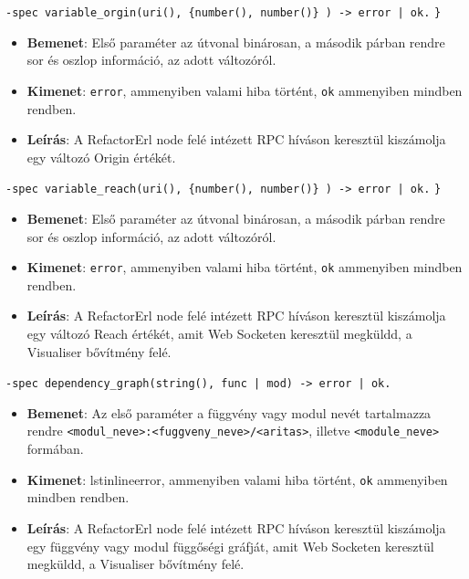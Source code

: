     
    
    \noindent \lstinline|-spec variable_orgin(uri(), {number(), number()} ) -> error |\lstinline{| ok.} \lstinline|}|
    \begin{itemize}
            \item \textbf{Bemenet}: Első paraméter az útvonal binárosan, a második párban rendre sor és oszlop információ, az adott változóról.
            \item \textbf{Kimenet}: \lstinline{error}, ammenyiben valami hiba történt, \lstinline{ok} ammenyiben mindben rendben.
            \item \textbf{Leírás}: A RefactorErl node felé intézett RPC híváson keresztül kiszámolja egy változó Origin értékét.
        \end{itemize}
    
    
    
    \noindent \lstinline|-spec variable_reach(uri(), {number(), number()} ) -> error |\lstinline{| ok.} \lstinline|}|
    \begin{itemize}
            \item \textbf{Bemenet}: Első paraméter az útvonal binárosan, a második párban rendre sor és oszlop információ, az adott változóról.
            \item \textbf{Kimenet}: \lstinline{error}, ammenyiben valami hiba történt, \lstinline{ok} ammenyiben mindben rendben.
            \item \textbf{Leírás}: A RefactorErl node felé intézett RPC híváson keresztül kiszámolja egy változó Reach értékét, amit Web Socketen keresztül megküldd, a Visualiser bővítmény felé. 
        \end{itemize}
    
    
    
    \noindent \lstinline{-spec dependency_graph(string(), func | mod) -> error | ok.}
    \begin{itemize}
            \item \textbf{Bemenet}: Az első paraméter a függvény vagy modul nevét tartalmazza rendre \lstinline{<modul_neve>:<fuggveny_neve>/<aritas>}, illetve \lstinline{<module_neve>} formában.
            \item \textbf{Kimenet}: lstinline{error}, ammenyiben valami hiba történt, \lstinline{ok} ammenyiben mindben rendben.
            \item \textbf{Leírás}: A RefactorErl node felé intézett RPC híváson keresztül kiszámolja egy függvény vagy modul függőségi gráfját, amit Web Socketen keresztül megküldd, a Visualiser bővítmény felé.
        \end{itemize}
    
